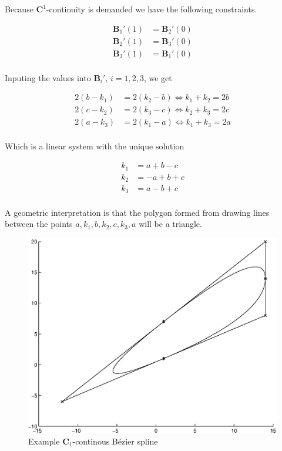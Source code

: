 \documentclass[paper=a4, fontsize=11pt]{scrartcl} %
\numberwithin{equation}{section} %
\numberwithin{figure}{section} %
\numberwithin{table}{section} %
\begin{document}
Because $\mathbf{C}^1$-continuity is demanded we have the following constraints.

\begin{align*}
  \mathbf{B}_1'(1) &= \mathbf{B}_2'(0)\\
  \mathbf{B}_2'(1) &= \mathbf{B}_3'(0)\\
  \mathbf{B}_3'(1) &= \mathbf{B}_1'(0)\\
\end{align*}

Inputing the values into $\mathbf{B}_i'$, $i=1,2,3$, we get

\begin{align*}
  2(b-k_1) &= 2(k_2-b) \iff k_1+k_2 = 2b\\
  2(c-k_2) &= 2(k_3-c) \iff k_2+k_3 = 2c\\
  2(a-k_3) &= 2(k_1-a) \iff k_1+k_3 = 2a\\
\end{align*}

Which is a linear system with the unique solution

\begin{align*}
  k_1 &= a+b-c\\
  k_2 &= -a+b+c\\
  k_3 &= a-b+c\\
\end{align*}

A geometric interpretation is that the polygon formed from drawing lines between
the points $a, k_1, b, k_2, c, k_3, a$ will be a triangle.

\begin{figure}[H]
  \centering
  \includegraphics{eps}
  \caption{Example $\mathbf{C}_1$-continous B\'ezier spline}
\end{figure} 
\end{document}
